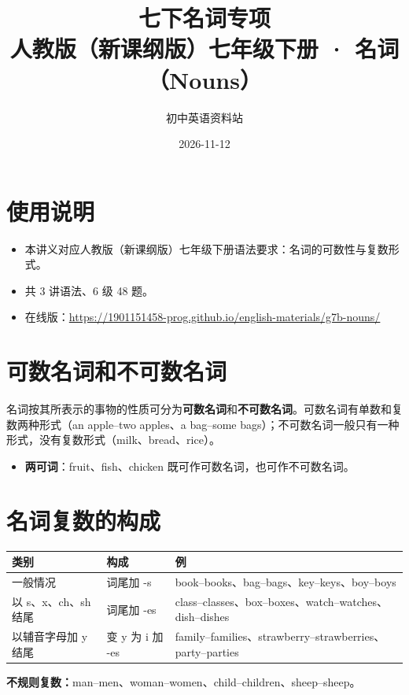 \documentclass[11pt,a4paper]{ctexart}
\title{\textbf{七下名词专项}\\[4pt]
\large 人教版（新课纲版）七年级下册 · 名词（Nouns）}
\author{初中英语资料站}
\date{2026-11-12}
\begin{document}
\maketitle

\section*{使用说明}
\begin{itemize}[leftmargin=1.4em]
\item 本讲义对应人教版（新课纲版）七年级下册语法要求：名词的可数性与复数形式。
\item 共 3 讲语法、6 级 48 题。
\item 在线版：\url{https://1901151458-prog.github.io/english-materials/g7b-nouns/}
\end{itemize}

\section{可数名词和不可数名词}
名词按其所表示的事物的性质可分为\textbf{可数名词}和\textbf{不可数名词}。可数名词有单数和复数两种形式（an apple--two apples、a bag--some bags）；不可数名词一般只有一种形式，没有复数形式（milk、bread、rice）。
\begin{itemize}[leftmargin=1.4em]
\item \textbf{两可词}：fruit、fish、chicken 既可作可数名词，也可作不可数名词。
\end{itemize}

\section{名词复数的构成}
\begin{center}
\begin{tabular}{p{4.8cm}p{3.4cm}p{6.0cm}}
\hline
\textbf{类别} & \textbf{构成} & \textbf{例}\\
\hline
一般情况 & 词尾加 -s & book--books、bag--bags、key--keys、boy--boys\\
以 s、x、ch、sh 结尾 & 词尾加 -es & class--classes、box--boxes、watch--watches、dish--dishes\\
以辅音字母加 y 结尾 & 变 y 为 i 加 -es & family--families、strawberry--strawberries、party--parties\\
\hline
\end{tabular}
\end{center}
\textbf{不规则复数：}man--men、woman--women、child--children、sheep--sheep。
\end{document}
